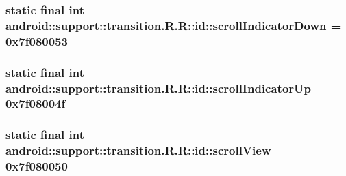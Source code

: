 \hypertarget{classandroid_1_1support_1_1transition_1_1_r_1_1id_491525dbfbda308b4a62165e4f59da68}{
\subsubsection[{scrollIndicatorDown}]{\setlength{\rightskip}{0pt plus 5cm}static final int android::support::transition.R.R::id::scrollIndicatorDown = 0x7f080053}}
\label{classandroid_1_1support_1_1transition_1_1_r_1_1id_491525dbfbda308b4a62165e4f59da68}


\hypertarget{classandroid_1_1support_1_1transition_1_1_r_1_1id_de494c84b13d065f3beff5f5e9193ecf}{
\subsubsection[{scrollIndicatorUp}]{\setlength{\rightskip}{0pt plus 5cm}static final int android::support::transition.R.R::id::scrollIndicatorUp = 0x7f08004f}}
\label{classandroid_1_1support_1_1transition_1_1_r_1_1id_de494c84b13d065f3beff5f5e9193ecf}


\hypertarget{classandroid_1_1support_1_1transition_1_1_r_1_1id_659c4537d5961eee8a57663bc3aa0731}{
\subsubsection[{scrollView}]{\setlength{\rightskip}{0pt plus 5cm}static final int android::support::transition.R.R::id::scrollView = 0x7f080050}}
\label{classandroid_1_1support_1_1transition_1_1_r_1_1id_659c4537d5961eee8a57663bc3aa0731}



